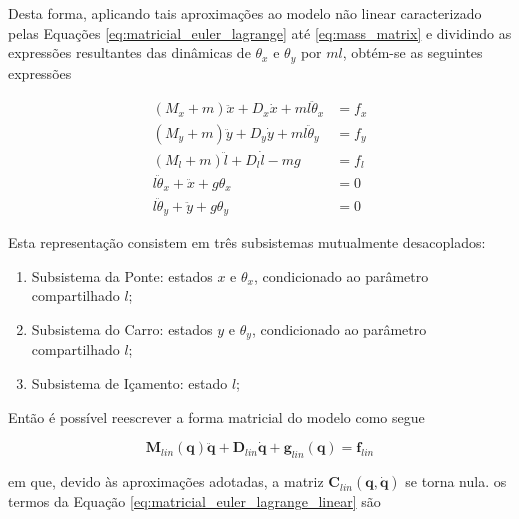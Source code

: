 \documentclass{ppgeesa}
\begin{document}
Desta forma, aplicando tais aproximações ao modelo não linear caracterizado pelas Equações \ref{eq:matricial_euler_lagrange} até \ref{eq:mass_matrix} e dividindo as expressões resultantes das dinâmicas de $\theta_x$ e $\theta_y$ por $ml$, obtém-se as seguintes expressões\cite{lee}

\begin{align}
  (M_x+m)\ddot{x}+D_x\dot{x}+ml\ddot{\theta}_x &= f_x\\
  (M_y+m)\ddot{y}+D_y\dot{y}+ml\ddot{\theta}_y &= f_y\\
  (M_l+m)\ddot{l}+D_l\dot{l}-mg &= f_l\\
  l\ddot{\theta}_x+\ddot{x}+g{\theta}_x &= 0\\
  l\ddot{\theta}_y+\ddot{y}+g{\theta}_y &= 0
\end{align}

Esta representação consistem em três subsistemas mutualmente desacoplados: 
\begin{enumerate}
  \item Subsistema da Ponte: estados $x$ e $\theta_x$, condicionado ao parâmetro compartilhado $l$;\\
  \item Subsistema do Carro: estados $y$ e $\theta_y$, condicionado ao parâmetro compartilhado $l$;\\
  \item Subsistema de Içamento: estado $l$;
\end{enumerate}

Então é possível reescrever a forma matricial do modelo como segue

\begin{equation}
  \mathbf{M}_{lin}(\mathbf{q})\ddot{\mathbf{q}}+\mathbf{D}_{lin}\dot{\mathbf{q}}+\mathbf{g}_{lin}(\mathbf{q}) = \mathbf{f}_{lin}\label{eq:matricial_euler_lagrange_linear}
\end{equation}

\noindent em que, devido às aproximações adotadas, a matriz $\mathbf{C}_{lin}(\mathbf{q}, \dot{\mathbf{q}})$ se torna nula. os termos da Equação \ref{eq:matricial_euler_lagrange_linear} são
\end{document}
